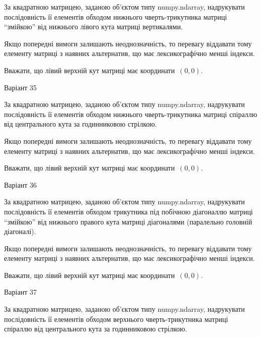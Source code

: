 \documentclass[11pt]{article}
\begin{document}
За квадратною матрицею, заданою об'єктом типу numpy.ndarray, надрукувати послідовність її елементів обходом нижнього чверть-трикутника матриці ``змійкою'' від нижнього лівого кута матриці вертикалями.

\vspace{2mm}
Якщо попередні вимоги залишають неоднозначність, то перевагу віддавати тому елементу матриці з наявних альтернатив, що має лексикографічно менші індекси.

Вважати, що лівий верхній кут матриці має координати~$(0,0)$.



{\Large \center  Варіант  35\par \bigskip\bigskip}

За квадратною матрицею, заданою об'єктом типу numpy.ndarray, надрукувати послідовність її елементів обходом нижнього чверть-трикутника матриці спіраллю від центрального кута за годинниковою стрілкою.

\vspace{2mm}
Якщо попередні вимоги залишають неоднозначність, то перевагу віддавати тому елементу матриці з наявних альтернатив, що має лексикографічно менші індекси.

Вважати, що лівий верхній кут матриці має координати~$(0,0)$.



{\Large \center  Варіант  36\par \bigskip\bigskip}

За квадратною матрицею, заданою об'єктом типу numpy.ndarray, надрукувати послідовність її елементів обходом трикутника під побічною діагоналлю матриці ``змійкою'' від нижнього правого кута матриці діагоналями (паралельно головній діагоналі).

\vspace{2mm}
Якщо попередні вимоги залишають неоднозначність, то перевагу віддавати тому елементу матриці з наявних альтернатив, що має лексикографічно менші індекси.

Вважати, що лівий верхній кут матриці має координати~$(0,0)$.



{\Large \center  Варіант  37\par \bigskip\bigskip}

За квадратною матрицею, заданою об'єктом типу numpy.ndarray, надрукувати послідовність її елементів обходом верхнього чверть-трикутника матриці спіраллю від центрального кута за годинниковою стрілкою.
\end{document}
